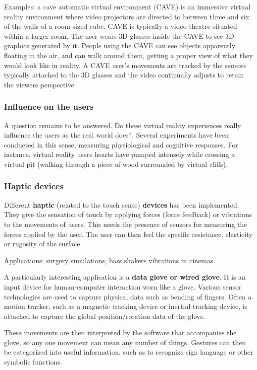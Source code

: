 Examples: a cave automatic virtual environment (CAVE) is an immersive virtual reality environment where video projectors are directed to between three and six of the walls of a room-sized cube. CAVE is typically a video theatre situated within a larger room. The user wears 3D glasses inside the CAVE to see 3D graphics generated by it. People using the CAVE can see objects apparently floating in the air, and can walk around them, getting a proper view of what they would look like in reality. A CAVE user's movements are tracked by the sensors typically attached to the 3D glasses and the video continually adjusts to retain the viewers perspective.

\subsubsection{Influence on the users}

A question remains to be answered. Do these virtual reality experiences really influence the users as the real world does?. Several experiments have been conducted in this sense, measuring physiological and cognitive responses. For instance, virtual  reality  users  hearts  have  pumped intensely  while  crossing  a  virtual pit (walking through a piece of wood surrounded by virtual cliffs). 

\subsubsection{Haptic devices}

Different \textbf{haptic} (related to the touch sense) \textbf{devices} has been implemented. They give the sensation of touch by applying forces (force feedback) or vibrations to the movements of users. This needs the presence of sensors for measuring the forces applied by the user. The user can then feel the specific resistance, elasticity or rugosity of the surface.

Applications:  surgery simulations, bass shakers vibrations in cinemas. 

A particularly interesting application is a \textbf{data glove or wired glove}. It is an input device for human-computer interaction worn like a glove. Various sensor technologies are used to capture physical data such as bending of fingers. Often a motion tracker, such as a magnetic tracking device or inertial tracking device, is attached to capture the global position/rotation data of the glove. 

These movements are then interpreted by the software that accompanies the glove, so any one movement can mean any number of things. Gestures can then be categorized into useful information, such as to recognize sign language or other symbolic functions.

